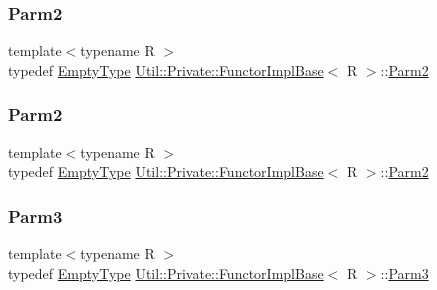 \mbox{\label{structUtil_1_1Private_1_1FunctorImplBase_a554085cd798ef14838a59b528f0feb2e}} 
\subsubsection{\texorpdfstring{Parm2}{Parm2}\hspace{0.1cm}{\footnotesize\ttfamily [2/3]}}
{\footnotesize\ttfamily template$<$typename R $>$ \\
typedef \mbox{\hyperlink{classUtil_1_1EmptyType}{Empty\+Type}} \mbox{\hyperlink{structUtil_1_1Private_1_1FunctorImplBase}{Util\+::\+Private\+::\+Functor\+Impl\+Base}}$<$ R $>$\+::\mbox{\hyperlink{structUtil_1_1Private_1_1FunctorImplBase_a554085cd798ef14838a59b528f0feb2e}{Parm2}}}

\mbox{\label{structUtil_1_1Private_1_1FunctorImplBase_a554085cd798ef14838a59b528f0feb2e}} 
\subsubsection{\texorpdfstring{Parm2}{Parm2}\hspace{0.1cm}{\footnotesize\ttfamily [3/3]}}
{\footnotesize\ttfamily template$<$typename R $>$ \\
typedef \mbox{\hyperlink{classUtil_1_1EmptyType}{Empty\+Type}} \mbox{\hyperlink{structUtil_1_1Private_1_1FunctorImplBase}{Util\+::\+Private\+::\+Functor\+Impl\+Base}}$<$ R $>$\+::\mbox{\hyperlink{structUtil_1_1Private_1_1FunctorImplBase_a554085cd798ef14838a59b528f0feb2e}{Parm2}}}

\mbox{\label{structUtil_1_1Private_1_1FunctorImplBase_a052148e627fd4caecbcffdbdf1033dbb}} 
\subsubsection{\texorpdfstring{Parm3}{Parm3}\hspace{0.1cm}{\footnotesize\ttfamily [1/3]}}
{\footnotesize\ttfamily template$<$typename R $>$ \\
typedef \mbox{\hyperlink{classUtil_1_1EmptyType}{Empty\+Type}} \mbox{\hyperlink{structUtil_1_1Private_1_1FunctorImplBase}{Util\+::\+Private\+::\+Functor\+Impl\+Base}}$<$ R $>$\+::\mbox{\hyperlink{structUtil_1_1Private_1_1FunctorImplBase_a052148e627fd4caecbcffdbdf1033dbb}{Parm3}}}

